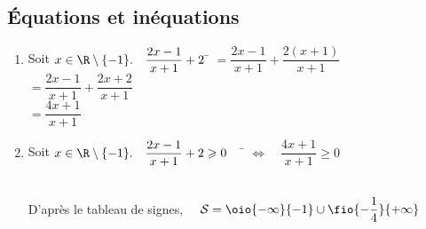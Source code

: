 \documentclass[a4paper,11pt,exos]{nsi} %
\begin{document}
\subsection*{Équations et inéquations}

\exo{}
\begin{enumerate}
	\item 	%
	\begin{tabbing}
		Soit $x\in\R\setminus\{-1\}. \quad \dfrac{2x-1}{x+1}+2$	\= $=\dfrac{2x-1}{x+1}+\dfrac{2(x+1)}{x+1}$\\[.5em]
		\>	$=\dfrac{2x-1}{x+1}+\dfrac{2x+2}{x+1}$\\[.5em]
		\>	$=\dfrac{4x+1}{x+1}$
	\end{tabbing}
	\item 	%
	\begin{tabbing}
		Soit $x\in\R\setminus\{-1\}. \quad \dfrac{2x-1}{x+1}+2 \geqslant 0 \quad$	\=	$\iff \quad \dfrac{4x+1}{x+1} \geqslant 0$
	\end{tabbing}
		\\[.5em]
	D'après le tableau de signes, $\quad\mathcal{S}=\oio{-\infty}{-1}\cup\fio{-\dfrac{1}{4}}{+\infty}$
\end{enumerate}
\end{document}
